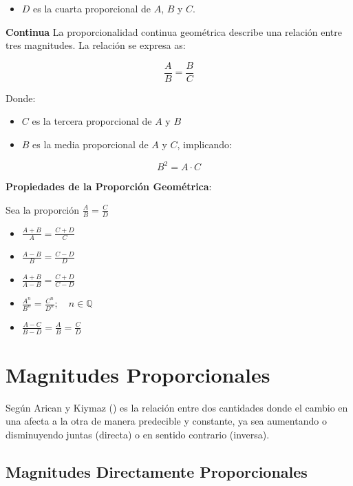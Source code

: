 \documentclass[
  stu,
  floatsintext,
  longtable,
  a4paper,
  nolmodern,
  notxfonts,
  notimes,
  colorlinks=true,linkcolor=blue,citecolor=blue,urlcolor=blue]{apa7}
\providecommand{\tightlist}{%
  \setlength{\itemsep}{0pt}\setlength{\parskip}{0pt}}
\begin{document}
\begin{itemize}
\tightlist
\item
  \(D\) es la cuarta proporcional de \(A\), \(B\) y \(C\).
\end{itemize}

\textbf{Continua} La proporcionalidad continua geométrica describe una
relación entre tres magnitudes. La relación se expresa as:

\[
\frac{A}{B} = \frac{B}{C}
\]

Donde:

\begin{itemize}
\item
  \(C\) es la tercera proporcional de \(A\) y \(B\)
\item
  \(B\) es la media proporcional de \(A\) y \(C\), implicando:
\end{itemize}

\[
B^2 = A \cdot C
\]

\textbf{Propiedades de la Proporción Geométrica}:

Sea la proporción \(\frac{A}{B} = \frac{C}{D}\)

\begin{itemize}
\item
  \(\frac{A+B}{A} = \frac{C+D}{C}\)
\item
  \(\frac{A-B}{B} = \frac{C-D}{D}\)
\item
  \(\frac{A+B}{A-B} = \frac{C+D}{C-D}\)
\item
  \(\frac{A^n}{B^n} = \frac{C^n}{D^n} ; \quad n \in \mathbb{Q}\)
\item
  \(\frac{A-C}{B-D} = \frac{A}{B} = \frac{C}{D}\)
\end{itemize}

\section{Magnitudes Proporcionales}\label{magnitudes-proporcionales}

Según Arican y Kiymaz
() es
la relación entre dos cantidades donde el cambio en una afecta a la otra
de manera predecible y constante, ya sea aumentando o disminuyendo
juntas (directa) o en sentido contrario (inversa).

\subsection{Magnitudes Directamente
Proporcionales}\label{magnitudes-directamente-proporcionales}
\end{document}
